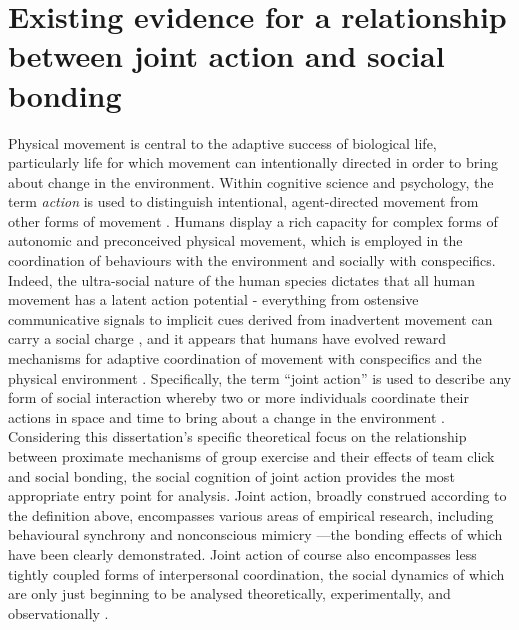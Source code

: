 \section{Existing evidence for a relationship between joint action and social bonding} %
Physical movement is central to the adaptive success of biological life, particularly life for which movement can intentionally directed in order to bring about change in the environment.  Within cognitive science and psychology, the term \textit{action} is used to distinguish intentional, agent-directed movement from other forms of movement \citep{Davidson1980}.  Humans display a rich capacity for complex forms of autonomic and preconceived physical movement, which is employed in the coordination of behaviours with the environment and socially with conspecifics.
Indeed, the ultra-social nature of the human species dictates that all human movement has a latent action potential - everything from ostensive communicative signals to implicit cues derived from inadvertent movement can carry a social charge \citep{Danchin2004}, and it appears that humans have evolved reward mechanisms for adaptive coordination of movement with conspecifics and the physical environment \citep{Wheatley2012,Parkinson2015,Wheatley2016}.
Specifically, the term ``joint action'' is used to describe any form of social interaction whereby two or more individuals coordinate their actions in space and time to bring about a change in the environment \citep{Sebanz2006a}. Considering this dissertation's specific theoretical focus on the relationship between proximate mechanisms of group exercise and their effects of team click and social bonding, the social cognition of joint action provides the most appropriate entry point for analysis.  Joint action, broadly construed according to the definition above, encompasses various areas of empirical research, including behavioural synchrony \citep{Reddish2013,Launay2016,Mogan2017} and nonconscious mimicry \citep{Bargh2012}---the bonding effects of which have been clearly demonstrated.
Joint action of course also encompasses less tightly coupled forms of interpersonal coordination, the social dynamics of which are only just beginning to be analysed theoretically, experimentally, and observationally \citep{Marsh2009}.

